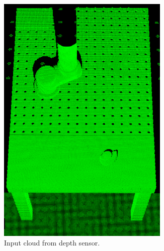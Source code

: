 \documentclass[../main.tex]{subfiles}
\begin{document}
\begin{figure}[H]
    \centering
    \begin{subfigure}[t]{0.2\textwidth}
        \centering
        \captionsetup{width=.9\textwidth}
        \includegraphics[width=0.9\textwidth]{figures/simulated_depth_sensor/scene_before_preprocessing.png}
        \caption{Input cloud from depth sensor.}
        \label{subfig:sds_initial_scene}
    \end{subfigure}
    \begin{subfigure}[t]{0.2\textwidth}
        \centering
        \captionsetup{width=.9\textwidth}

\end{subfigure}
\end{figure}
\end{document}
